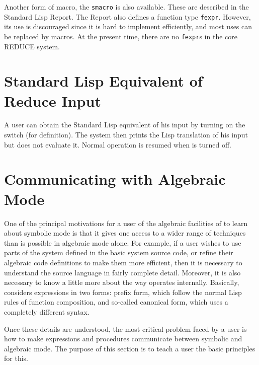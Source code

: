 \hypertarget{reserved:SMACRO}{}
\hypertarget{reserved:INLINE}{}
\hypertarget{reserved:FEXPR}{}
Another form of macro, the \texttt{smacro} is also available.
These are described in the Standard Lisp Report.  The Report also defines
a function type \texttt{fexpr}.
However, its use is discouraged since it is hard to implement efficiently,
and most uses can be replaced by macros.  At the present time, there are
no \texttt{fexpr}s in the core REDUCE system.

\section{Standard Lisp Equivalent of Reduce Input}
\hypertarget{switch:DEFN}{}

A user can obtain the Standard Lisp equivalent of his {\REDUCE} input by
turning on the switch  (for definition).  The
system then prints the Lisp translation of his input but does not evaluate
it.  Normal operation is resumed when  is turned off.

\section{Communicating with Algebraic Mode}
\hypertarget{command:SHARE}{}

One of the principal motivations for a user of the algebraic facilities of
{\REDUCE} to learn about symbolic mode is that it
gives one access to a wider range of techniques than is possible in
algebraic mode alone.  For example, if a user
wishes to use parts of the system defined in the basic system source code,
or refine their algebraic code definitions to make them more efficient,
then it is necessary to understand the source language in fairly complete
detail.  Moreover, it is also necessary to know a little more about the
way {\REDUCE} operates internally.  Basically, {\REDUCE} considers
expressions in two forms: prefix form, which follow the normal Lisp rules
of function composition, and so-called canonical form, which uses a
completely different syntax.

Once these details are understood, the most critical problem faced by a
user is how to make expressions and procedures communicate between symbolic
and algebraic mode. The purpose of this section is to teach a user the
basic principles for this.

